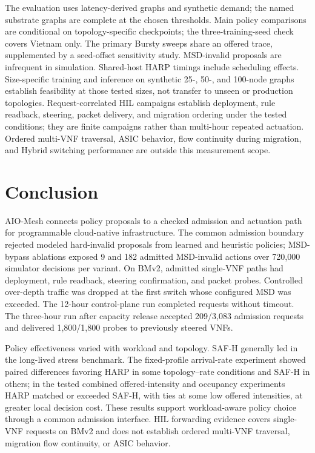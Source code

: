 \documentclass[final,5p]{elsarticle}
\newcommand{\rev}[1]{\textcolor{revisiongreen}{#1}}
\let\newrev\rev
\begin{document}
\newrev{The evaluation uses latency-derived graphs and synthetic demand; the named substrate graphs are complete at the chosen thresholds. Main policy comparisons are conditional on topology-specific checkpoints; the three-training-seed check covers Vietnam only. The primary Bursty sweeps share an offered trace, supplemented by a seed-offset sensitivity study. MSD-invalid proposals are infrequent in simulation. Shared-host HARP timings include scheduling effects. Size-specific training and inference on synthetic 25-, 50-, and 100-node graphs establish feasibility at those tested sizes, not transfer to unseen or production topologies. Request-correlated HIL campaigns establish deployment, rule readback, steering, packet delivery, and migration ordering under the tested conditions; they are finite campaigns rather than multi-hour repeated actuation. Ordered multi-VNF traversal, ASIC behavior, flow continuity during migration, and Hybrid switching performance are outside this measurement scope.}

\section{Conclusion}
\label{sec:conclusion}
\newrev{AIO-Mesh connects policy proposals to a checked admission and actuation path for programmable cloud-native infrastructure. The common admission boundary rejected modeled hard-invalid proposals from learned and heuristic policies; MSD-bypass ablations exposed 9 and 182 admitted MSD-invalid actions over 720,000 simulator decisions per variant. On BMv2, admitted single-VNF paths had deployment, rule readback, steering confirmation, and packet probes. Controlled over-depth traffic was dropped at the first switch whose configured MSD was exceeded. The 12-hour control-plane run completed \HILRequests{} requests without timeout. The three-hour run after capacity release accepted 209/3,083 admission requests and delivered 1,800/1,800 probes to previously steered VNFs.}

\newrev{Policy effectiveness varied with workload and topology. SAF-H generally led in the long-lived stress benchmark. The fixed-profile arrival-rate experiment showed paired differences favoring HARP in some topology--rate conditions and SAF-H in others; in the tested combined offered-intensity and occupancy experiments HARP matched or exceeded SAF-H, with ties at some low offered intensities, at greater local decision cost. These results support workload-aware policy choice through a common admission interface. HIL forwarding evidence covers single-VNF requests on BMv2 and does not establish ordered multi-VNF traversal, migration flow continuity, or ASIC behavior.}
\end{document}
